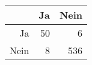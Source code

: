 \begin{table}[ht]
\centering
\begin{tabular}{rrr}
  \hline
 & Ja & Nein \\ 
  \hline
Ja &  50 &   6 \\ 
  Nein &   8 & 536 \\ 
   \hline
\end{tabular}
\end{table}
